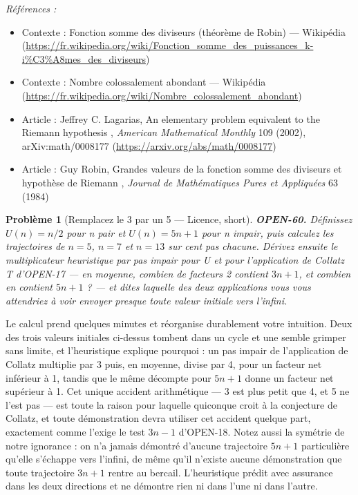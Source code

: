 \documentclass[11pt]{article}
\newtheorem{problem}{Problème}
\newenvironment{refs}{\par\small\noindent\emph{Références :}\begin{itemize}\setlength\itemsep{0pt}}{\end{itemize}\normalsize}
\begin{document}
\begin{refs}
\item Contexte : Fonction somme des diviseurs (théorème de Robin) --- Wikipédia (\url{https://fr.wikipedia.org/wiki/Fonction_somme_des_puissances_k-i%C3%A8mes_des_diviseurs})
\item Contexte : Nombre colossalement abondant --- Wikipédia (\url{https://fr.wikipedia.org/wiki/Nombre_colossalement_abondant})
\item Article : Jeffrey C. Lagarias, \og{} An elementary problem equivalent to the Riemann hypothesis \fg{}, \textit{American Mathematical Monthly} 109 (2002), arXiv:math/0008177 (\url{https://arxiv.org/abs/math/0008177})
\item Article : Guy Robin, \og{} Grandes valeurs de la fonction somme des diviseurs et hypothèse de Riemann \fg{}, \textit{Journal de Mathématiques Pures et Appliquées} 63 (1984)
\end{refs}

\bigskip

\begin{problem}[{Remplacez le 3 par un 5 --- Licence, short}]
\textbf{OPEN-60.} Définissez $ U(n) = n/2 $ pour n pair et
$ U(n) = 5n + 1 $ pour n impair, puis calculez les trajectoires de $ n = 5 $,
$ n = 7 $ et $ n = 13 $ sur cent pas chacune. Dérivez ensuite le multiplicateur
heuristique par pas impair pour U et pour l'application de Collatz T d'OPEN-17 --- en
moyenne, combien de facteurs 2 contient $ 3n+1 $, et combien en contient $ 5n+1 $ ? ---
et dites laquelle des deux applications vous vous attendriez à voir envoyer presque toute
valeur initiale vers l'infini.
\end{problem}

\noindent Le calcul prend quelques minutes et réorganise durablement votre
intuition. Deux des trois valeurs initiales ci-dessus tombent dans un cycle et une semble
grimper sans limite, et l'heuristique explique pourquoi : un pas impair de l'application de
Collatz multiplie par 3 puis, en moyenne, divise par 4, pour un facteur net inférieur à 1,
tandis que le même décompte pour $ 5n+1 $ donne un facteur net supérieur à 1. Cet unique
accident arithmétique --- 3 est plus petit que 4, et 5 ne l'est pas --- est toute la raison
pour laquelle quiconque croit à la conjecture de Collatz, et toute démonstration devra
utiliser cet accident quelque part, exactement comme l'exige le test $ 3n-1 $ d'OPEN-18.
Notez aussi la symétrie de notre ignorance : on n'a jamais démontré d'aucune trajectoire
$ 5n+1 $ particulière qu'elle s'échappe vers l'infini, de même qu'il n'existe aucune
démonstration que toute trajectoire $ 3n+1 $ rentre au bercail. L'heuristique prédit avec
assurance dans les deux directions et ne démontre rien ni dans l'une ni dans l'autre.
\end{document}
